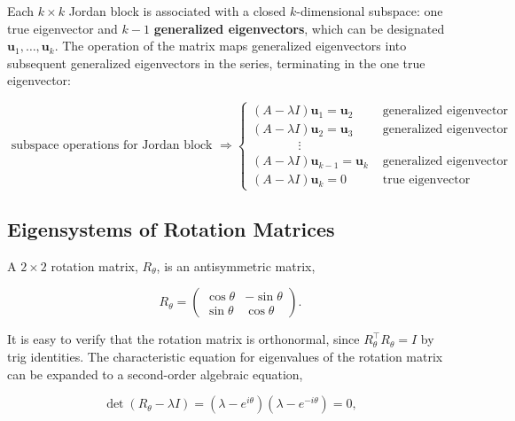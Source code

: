 \documentclass[12pt, twoside, draft]{article}
\begin{document}
Each $k \times k$ Jordan block is associated with a closed $k$-dimensional subspace: one true eigenvector and $k-1$ \textbf{generalized eigenvectors}, which can be designated $\mathbf{u}_1, \ldots, \mathbf{u}_k$.  The operation of the matrix maps generalized eigenvectors into subsequent generalized eigenvectors in the series, terminating in the one true eigenvector:

\begin{equation}\label{eq:jordan_block_subspace}
\text{ subspace operations for Jordan block } \Rightarrow 
\begin{cases}
(A - \lambda I) \mathbf{u}_1 = \mathbf{u}_2 & \text{ generalized eigenvector } \\
(A - \lambda I) \mathbf{u}_2 = \mathbf{u}_3 & \text{ generalized eigenvector } \\
\hspace{45pt} \vdots & \\
(A - \lambda I) \mathbf{u}_{k-1} = \mathbf{u}_k & \text{ generalized eigenvector } \\
(A - \lambda I) \mathbf{u}_k = 0 & \text{ true eigenvector }
\end{cases}
\end{equation}

\subsection{Eigensystems of Rotation Matrices}\label{sec:eigensystems-rotation}
A $2 \times 2$ rotation matrix, $R_\theta$, is an antisymmetric matrix,

\begin{equation}\label{eq:rotation_matrix}
R_\theta = \begin{pmatrix} \cos \theta & -\sin \theta \\ \sin \theta & \cos \theta \end{pmatrix} .
\end{equation}

It is easy to verify that the rotation matrix is orthonormal, since $R_\theta^\top R_\theta = I$ by trig identities.  The characteristic equation for eigenvalues of the rotation matrix can be expanded to a second-order algebraic equation,

\begin{equation}\label{eq:rotation_matrix_eigenvalues}
\det(R_\theta - \lambda I) = (\lambda - e^{i \theta})(\lambda - e^{- i \theta}) = 0,
\end{equation}
\end{document}

